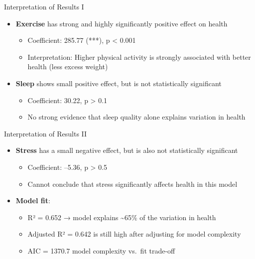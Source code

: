 \documentclass[
  11pt,
  ignorenonframetext,
]{beamer}
\providecommand{\tightlist}{%
  \setlength{\itemsep}{0pt}\setlength{\parskip}{0pt}}
\begin{document}
\begin{frame}{Interpretation of Results I}
\label{interpretation-of-results-i}
\begin{itemize}
\tightlist
\item
  \textbf{Exercise} has strong and highly significantly positive effect
  on health

  \begin{itemize}
  \tightlist
  \item
    Coefficient: 285.77 (***), p \textless{} 0.001\\
  \item
    Interpretation: Higher physical activity is strongly associated with
    better health (less excess weight)
  \end{itemize}
\item
  \textbf{Sleep} shows small positive effect, but is not statistically
  significant

  \begin{itemize}
  \tightlist
  \item
    Coefficient: 30.22, p \textgreater{} 0.1\\
  \item
    No strong evidence that sleep quality alone explains variation in
    health
  \end{itemize}
\end{itemize}
\end{frame}

\begin{frame}{Interpretation of Results II}
\label{interpretation-of-results-ii}
\begin{itemize}
\tightlist
\item
  \textbf{Stress} has a small negative effect, but is also not
  statistically significant

  \begin{itemize}
  \tightlist
  \item
    Coefficient: --5.36, p \textgreater{} 0.5\\
  \item
    Cannot conclude that stress significantly affects health in this
    model
  \end{itemize}
\item
  \textbf{Model fit}:

  \begin{itemize}
  \tightlist
  \item
    R² = 0.652 → model explains \textasciitilde65\% of the variation in
    health
  \item
    Adjusted R² = 0.642 is still high after adjusting for model
    complexity
  \item
    AIC = 1370.7 model complexity vs.~fit trade-off
  \end{itemize}
\end{itemize}
\end{frame}
\end{document}
